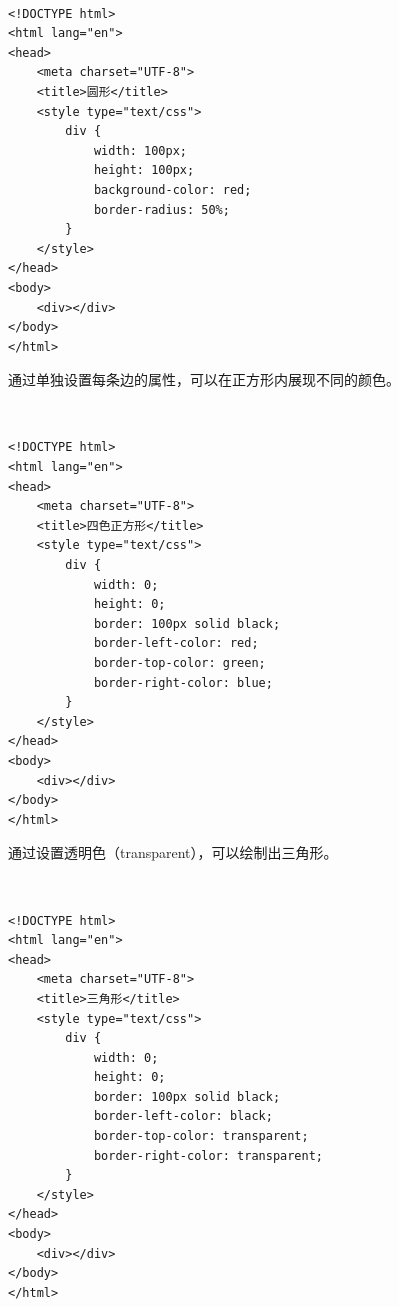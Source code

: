 \\

\begin{lstlisting}[style=htmlcssjs]
<!DOCTYPE html>
<html lang="en">
<head>
    <meta charset="UTF-8">
    <title>圆形</title>
    <style type="text/css">
        div {
            width: 100px;
            height: 100px;
            background-color: red;
            border-radius: 50%;
        }
    </style>
</head>
<body>
    <div></div>
</body>
</html>
\end{lstlisting}

通过单独设置每条边的属性，可以在正方形内展现不同的颜色。

\begin{figure}[H]
	\centering
\end{figure}

\\

\begin{lstlisting}[style=htmlcssjs]
<!DOCTYPE html>
<html lang="en">
<head>
    <meta charset="UTF-8">
    <title>四色正方形</title>
    <style type="text/css">
        div {
            width: 0;
            height: 0;
            border: 100px solid black;
            border-left-color: red;
            border-top-color: green;
            border-right-color: blue;
        }
    </style>
</head>
<body>
    <div></div>
</body>
</html>
\end{lstlisting}

通过设置透明色（transparent），可以绘制出三角形。

\begin{figure}[H]
	\centering
\end{figure}

\\

\begin{lstlisting}[style=htmlcssjs]
<!DOCTYPE html>
<html lang="en">
<head>
    <meta charset="UTF-8">
    <title>三角形</title>
    <style type="text/css">
        div {
            width: 0;
            height: 0;
            border: 100px solid black;
            border-left-color: black;
            border-top-color: transparent;
            border-right-color: transparent;
        }
    </style>
</head>
<body>
    <div></div>
</body>
</html>
\end{lstlisting}

